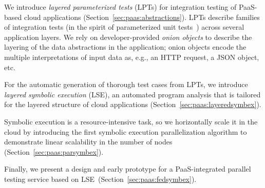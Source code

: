 We introduce \textit{layered parameterized tests} (LPTs) for integration testing of PaaS-based cloud applications (Section~\ref{sec:paas:abstractions}). LPTs describe families of integration tests (in the spirit of parameterized unit tests~\cite{tillmann-puts}) across several application layers. We rely on developer-provided \textit{onion objects} to describe the layering of the data abstractions in the application; onion objects encode the multiple interpretations of input data as, e.g., an HTTP request, a JSON object, etc.

For the automatic generation of thorough test cases from LPTs, we introduce \emph{layered symbolic execution} (LSE), an automated program analysis that is tailored for the layered structure of cloud applications (Section~\ref{sec:paas:layeredsymbex}).

Symbolic execution is a resource-intensive task, so we horizontally scale it in the cloud by introducing the first symbolic execution parallelization algorithm to demonstrate linear scalability in the number of nodes (Section~\ref{sec:paas:parsymbex}).

Finally, we present a design and early prototype for a PaaS-integrated parallel testing service based on LSE~(Section~\ref{sec:paas:fedsymbex}).

